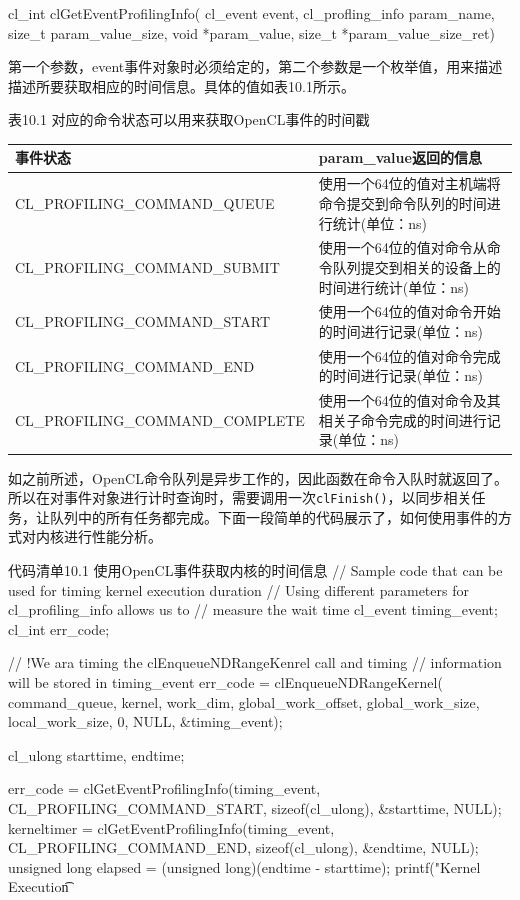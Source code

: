 \begin{codebox}[cpp]
cl_int clGetEventProfilingInfo(
  cl_event event,
  cl_profling_info param_name,
  size_t param_value_size,
  void *param_value,
  size_t *param_value_size_ret)
\end{codebox}

第一个参数，event事件对象时必须给定的，第二个参数是一个枚举值，用来描述描述所要获取相应的时间信息。具体的值如表10.1所示。

表10.1 对应的命令状态可以用来获取OpenCL事件的时间戳

\par\medskip\noindent
\begingroup\fontsize{9bp}{12.5bp}\selectfont\renewcommand{\arraystretch}{1.12}
\begin{center}
\begin{tabularx}{\textwidth}{XX}
\toprule
事件状态 & param\_value返回的信息 \\
\midrule
CL\_PROFILING\_COMMAND\_QUEUE & 使用一个64位的值对主机端将命令提交到命令队列的时间进行统计(单位：ns) \\
CL\_PROFILING\_COMMAND\_SUBMIT & 使用一个64位的值对命令从命令队列提交到相关的设备上的时间进行统计(单位：ns) \\
CL\_PROFILING\_COMMAND\_START & 使用一个64位的值对命令开始的时间进行记录(单位：ns) \\
CL\_PROFILING\_COMMAND\_END & 使用一个64位的值对命令完成的时间进行记录(单位：ns) \\
CL\_PROFILING\_COMMAND\_COMPLETE & 使用一个64位的值对命令及其相关子命令完成的时间进行记录(单位：ns) \\
\bottomrule
\end{tabularx}
\end{center}
\endgroup
\medskip

如之前所述，OpenCL命令队列是异步工作的，因此函数在命令入队时就返回了。所以在对事件对象进行计时查询时，需要调用一次\texttt{clFinish()}，以同步相关任务，让队列中的所有任务都完成。下面一段简单的代码展示了，如何使用事件的方式对内核进行性能分析。

\begin{codeboxt}[cpp]{代码清单10.1 使用OpenCL事件获取内核的时间信息}
// Sample code that can be used for timing kernel execution duration
// Using different parameters for cl_profiling_info allows us to
// measure the wait time
cl_event timing_event;
cl_int err_code;

// !We ara timing the clEnqueueNDRangeKenrel call and timing
// information will be stored in timing_event
err_code = clEnqueueNDRangeKernel(
  command_queue,
  kernel,
  work_dim,
  global_work_offset,
  global_work_size,
  local_work_size,
  0, NULL, &timing_event);

cl_ulong starttime, endtime;

err_code = clGetEventProfilingInfo(timing_event, CL_PROFILING_COMMAND_START, sizeof(cl_ulong), &starttime, NULL);
kerneltimer = clGetEventProfilingInfo(timing_event, CL_PROFILING_COMMAND_END, sizeof(cl_ulong), &endtime, NULL);
unsigned long elapsed = (unsigned long)(endtime - starttime);
printf("Kernel Execution\t%
\end{codeboxt}



